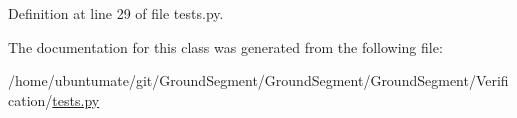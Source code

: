 Definition at line 29 of file tests.\+py.



The documentation for this class was generated from the following file\+:\begin{DoxyCompactItemize}
\item 
/home/ubuntumate/git/\+Ground\+Segment/\+Ground\+Segment/\+Ground\+Segment/\+Verification/\hyperlink{_verification_2tests_8py}{tests.\+py}\end{DoxyCompactItemize}
